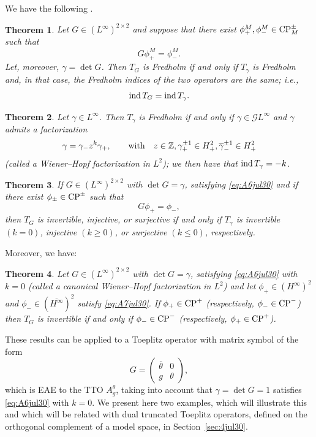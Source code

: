\documentclass[11pt]{article}
\newtheorem{thm}{Theorem}[section]
\def\G{\mathcal G}
\def\ZZ{\mathbb Z}
\def\beq{\begin{equation}}
\def\eeq{\end{equation}}
\def\ol{\overline}
\def\ind{\mathop{\rm ind}\nolimits}
\def\CP{{\rm CP}}
\begin{document}
We have the following \cite{CDR10}.

\begin{thm}
Let $G \in (L^\infty)^{2 \times 2}$ and suppose that there exist
$\phi^M_+, \phi^M_- \in \CP^\pm_M$ such that
\[
G\phi^M_+=\phi^M_-.
\]
Let, moreover, $\gamma=\det G$. Then $T_G$ is Fredholm if and only if $T_\gamma$ is Fredholm and, in that case,
the Fredholm indices of the two operators are the same; i.e.,
\[
\ind T_G = \ind T_\gamma.
\]
\end{thm}
\begin{thm}\cite{CDR10}
Let $\gamma \in L^\infty$. Then $T_\gamma$ is Fredholm if and only if $\gamma\in \G L^\infty$ and $\gamma$ admits a factorization
\beq\label{eq:A6jul30}
\gamma=\gamma_- z^k \gamma_+ , \qquad \hbox{with} \quad
z \in \ZZ, \gamma_+^{\pm 1} \in H^2_+, \ol\gamma_-^{\pm 1} \in H^2_+
\eeq
(called a {\em Wiener--Hopf factorization in $L^2$}); we then have that $\ind T_\gamma=-k$.
\end{thm}
\begin{thm}\label{thm:A3jul30} \cite{CDR10}
If $G \in (L^\infty)^{2 \times 2}$ with $\det G=\gamma$, satisfying \eqref{eq:A6jul30}
and if there exist $\phi_\pm \in \CP^\pm$ such that
\beq\label{eq:A7jul30}
G\phi_+=\phi_-,
\eeq
then $T_G$ is invertible, injective, or surjective if and only if $T_\gamma$ is invertible $(k=0)$,
injective $(k \ge 0)$, or surjective $(k \le 0)$, respectively.
\end{thm}
Moreover, we have:
\begin{thm}\label{thm:A4jul30}
Let $G \in (L^\infty)^{2 \times 2}$ with $\det G=\gamma$, satisfying \eqref{eq:A6jul30} with $k=0$ (called a canonical Wiener--Hopf factorization in $L^2$) and let $\phi_+ \in (H^\infty)^2$ and $\phi_- \in (\ol{H^\infty})^2$ satisfy \eqref{eq:A7jul30}. If $\phi_+ \in \CP^+$
(respectively, $\phi_- \in \CP^-$) then $T_G$ is invertible if and only if $\phi_- \in \CP^-$
(respectively,  $\phi_+ \in \CP^+$).
\end{thm}
These results can be applied to a Toeplitz operator with matrix symbol of the form
\beq\label{eq:A8jul30}
G  = \begin{pmatrix}
\ol\theta & 0 \\ g & \theta
\end{pmatrix},
\eeq
which is EAE to the TTO $A^\theta_g$, taking into account that $\gamma=\det G=1$ satisfies 
\eqref{eq:A6jul30} with $k=0$. We present here two examples, which will illustrate this and which
will be related with dual truncated Toeplitz operators, defined on the orthogonal complement of a model space, in Section~\ref{sec:4jul30}.
\end{document}
